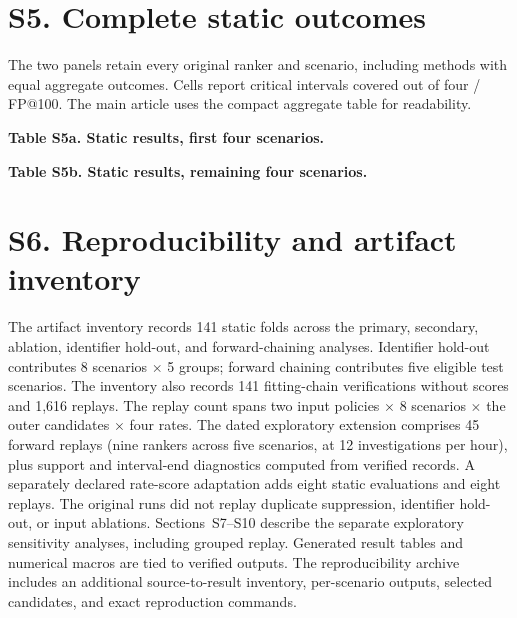 \documentclass[pdflatex,sn-basic,Numbered]{sn-jnl}
\begin{document}


\begin{tableorg}[t]
\centering\small
\caption{Exploratory rate-score adaptation: static outcomes by held-out scenario.}
\unskip
\end{tableorg}

\section*{S5. Complete static outcomes}
The two panels retain every original ranker and scenario, including methods with equal aggregate outcomes. Cells report critical intervals covered out of four / FP@100. The main article uses the compact aggregate table for readability.

\clearpage
\begin{center}
\footnotesize
\textbf{Table S5a. Static results, first four scenarios.}\par\medskip
\unskip
\par\bigskip
\textbf{Table S5b. Static results, remaining four scenarios.}\par\medskip
\unskip
\end{center}

\section*{S6. Reproducibility and artifact inventory}
The artifact inventory records 141 static folds across the primary, secondary, ablation, identifier hold-out, and forward-chaining analyses. Identifier hold-out contributes 8 scenarios $\times$ 5 groups; forward chaining contributes five eligible test scenarios. The inventory also records 141 fitting-chain verifications without scores and 1,616 replays. The replay count spans two input policies $\times$ 8 scenarios $\times$ the outer candidates $\times$ four rates. The dated exploratory extension comprises 45 forward replays (nine rankers across five scenarios, at 12 investigations per hour), plus support and interval-end diagnostics computed from verified records. A separately declared rate-score adaptation adds eight static evaluations and eight replays. The original runs did not replay duplicate suppression, identifier hold-out, or input ablations. Sections~S7--S10 describe the separate exploratory sensitivity analyses, including grouped replay. Generated result tables and numerical macros are tied to verified outputs. The reproducibility archive includes an additional source-to-result inventory, per-scenario outputs, selected candidates, and exact reproduction commands.




\end{document}
